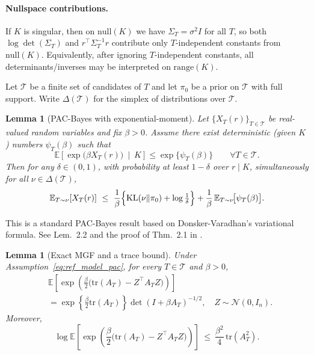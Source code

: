 \documentclass{article}
\theoremstyle{plain}
\newtheorem{lemma}[theorem]{Lemma}
\theoremstyle{definition}
\theoremstyle{remark}
\begin{document}
\paragraph{Nullspace contributions.}
If $K$ is singular, then on $\mathrm{null}(K)$ we have $\Sigma_T=\sigma^2 I$ for all $T$, so both
$\log\det(\Sigma_T)$ and $r^\top \Sigma_T^{-1} r$ contribute only $T$-independent constants from $\mathrm{null}(K)$.
Equivalently, after ignoring $T$-independent constants, all determinants/inverses may be interpreted on $\mathrm{range}(K)$.


Let $\mathcal T$ be a finite set of candidates of $T$ and let $\pi_0$ be a prior on $\mathcal T$ with full support. Write $\Delta(\mathcal T)$ for the simplex of distributions over $\mathcal T$.

\begin{lemma}[PAC-Bayes with exponential-moment]
\label{lem:app_pac_mgf}
Let $\{X_T(r)\}_{T\in\mathcal T}$ be real-valued random variables and fix $\beta>0$.
Assume there exist deterministic (given $K$) numbers $\psi_T(\beta)$ such that
\begin{equation}
\mathbb E\!\left[\exp\!\bigl(\beta X_T(r)\bigr)\ \middle|\ K\right] \le \exp\{\psi_T(\beta)\}
\qquad \forall T\in\mathcal T.
\label{eq:app_mgf_cert}
\end{equation}
Then for any $\delta\in(0,1)$, with probability at least $1-\delta$ over $r\mid K$, simultaneously for all
$\nu\in\Delta(\mathcal T)$,
\begin{equation}
\mathbb E_{T\sim\nu}[X_T(r)]
\ \le\
\frac{1}{\beta}\Bigl\{\mathrm{KL}(\nu\|\pi_0)+\log\tfrac{1}{\delta}\Bigr\}
+\frac{1}{\beta}\,\mathbb E_{T\sim\nu}\!\bigl[\psi_T(\beta)\bigr].
\label{eq:app_pac_general}
\end{equation}
\end{lemma}

This is a standard PAC-Bayes result based on Donsker-Varadhan's variational formula. See Lem.~2.2 and the proof of Thm.~2.1 in \citet{alquier2024user}.


\begin{lemma}[Exact MGF and a trace bound]
\label{lem:app_gaussian_mgf}
Under Assumption~\ref{eq:ref_model_pac}, for every $T\in\mathcal T$ and $\beta>0$,
\begin{align}
&\mathbb E\!\left[\exp\!\left(\frac{\beta}{2}\bigl(\mathrm{tr}(A_T)-Z^\top A_T Z\bigr)\right)\right] \\
&=
\exp\!\left\{\frac{\beta}{2}\mathrm{tr}(A_T)\right\}  \det(I+\beta A_T)^{-1/2},
\quad Z\sim\mathcal N(0,I_n).
\label{eq:app_exact_mgf}
\end{align}
Moreover,
\begin{equation}
\log \mathbb E\!\left[\exp\!\left(\frac{\beta}{2}\bigl(\mathrm{tr}(A_T)-Z^\top A_T Z\bigr)\right)\right]
\ \le\ \frac{\beta^2}{4}\,\mathrm{tr}(A_T^2).
\label{eq:app_mgf_trA2}
\end{equation}
\end{lemma}
\end{document}
